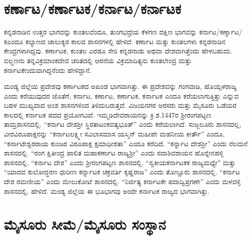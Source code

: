 \section{ಕರ್ಣಾಟ/ಕರ್ಣಾಟಕ/ಕರ್ನಾಟ/ಕರ್ನಾಟಕ}

ಕನ್ನಡನಾಡಿನ ಉತ್ತರ ಭಾಗವನ್ನು ಕುಂತಲವೆಂದೂ, ತುಂಗಭದ್ರೆಯ ಕೆಳಗಣ ದಕ್ಷಿಣ ಭಾಗವನ್ನು ಕರ್ನಾಟ/ಕರ್ಣ್ನಾಟ/ಕ\break ಎಂದೂ ಕಲ್ಯಾಣದ ಚಾಲುಕ್ಯರ ಕಾಲದ ಶಾಸನಗಳಲ್ಲಿ ಹೇಳಿದೆ. ಕರ್ಣಾಟ ಮತ್ತು ಕುಂತಲಗಳು ಕನ್ನಡನಾಡಿನ ಕೇಂದ್ರಗಳಾ\-ಗಿದ್ದವು. ಕರ್ಣಾಟಕ, ಕುಂತಲ ಎರಡೂ ಸೇರಿ ಕನ್ನಡನಾಡು ಅಥವಾ ದೇಶವಾಗಿತ್ತೆಂದು ಹೇಳಬಹುದು. ಬಿಲ್ಹಣನು ತನ್ನ\break ವಿಕ್ರಮಾಂಕದೇವ ಚರಿತದಲ್ಲಿ ಆರನೆಯ ವಿಕ್ರಮಾದಿತ್ಯನು ಕುಂತಲೇಂದ್ರ ಮತ್ತು ಕರ್ನಾಟಕೇಂದುವಾಗಿದ್ದನೆಂದು ಹೇಳಿದ್ದಾನೆ.

ಮಂಡ್ಯ ಜಿಲ್ಲೆಯ ಪ್ರದೇಶವು ಕರ್ಣಾಟಕದ ಅಖಂಡ ಭಾಗವಾಗಿತ್ತು. ಈ ಪ್ರದೇಶವನ್ನು ಗಂಗವಾಡಿ, ಹೊಯ್ಸಳರಾಜ್ಯ ಎಂದು ಕರೆಯುವುದರ ಜೊತೆಗೆ, ಕರ್ನಾಟ, ಕರ್ಣಾಟ, ಕರ್ಣಾಟಕ, ಕರ್ನಾಟಕ ಎಂದೂ ಕರೆಯಲಾಗುತ್ತಿತ್ತು ಎನ್ನುವ ಬಹಳ ಮುಖ್ಯವಾದ ಅಂಶ ಶಾಸನಗಳಿಂದ ತಿಳಿದುಬರುತ್ತದೆ. ವಿಜಯನಗರ ಅರಸರು ಮತ್ತು ಮೈಸೂರು ಒಡೆಯರ ಕಾಲದಲ್ಲಿ ಕರ್ನಾಟಕ ಪದದ ಪ್ರಯೋಗವಿದೆ. ಇಮ್ಮಡಿದೇವರಾಯನನ್ನು ಕ್ರಿ.ಶ.1447ರ ಶ‍್ರೀರಂಗಪಟ್ಟಣ ತಾಮ್ರಶಾಸನದಲ್ಲಿ. “ಕರ್ನಾಟ ದೇಶಶ‍್ರೀ ಸ್ಥಿರತಾಟಂಕವತ್ಯಭೂತ್​” ಎಂದು ಕರೆಯಲಾಗಿದೆ. ಸುಜ್ಜಲೂರು ಶಾಸನದಲ್ಲ, ವೀರವಿರೂಪಾಕ್ಷನನ್ನು “ಕರ್ನಾಟಲಕ್ಷ್ಮೀ ಸವಿಲಾಸಮಾಸ ಯಸ್ಮಿನ್​ ಮಹೀಪೇ ಮಹನೀಯ ಕೀರ್ತೌ” ಎಂದೂ, “ಕರ್ನಾಟೇಶ್ವರರಾಯ ಕುಂಜರ ವಿರೂಪಾಕ್ಷ ಕ್ಷಮಾಧೀಶತಾ” ಎಂದೂ ಕರೆದಿದೆ. “ಕರ್ನ್ನಾಟ ದೇಶಶ‍್ರೀ” ಎಂದು ನೆಲಮನೆ ಶಾಸನದಲ್ಲಿ. “ರಂಗ ಕ್ಷಿತೀಂದ್ರ ಪಾಲಿತ ಮಹಾಕರ್ಣಾಟ ರಾಜ್ಯಶ‍್ರೀ” ಎಂದು ಸದಾಶಿವರಾಯನ ಹೊನ್ನೇನಹಳ್ಳಿ ಶಾಸನದಲ್ಲಿ. “ಕರ್ನಾಟ ದೇಶ” ಎಂದು ಶ‍್ರೀರಂಗಪಟ್ಟಣ ಶಾಸನದಲ್ಲಿ. “ಸ್ವಕೀಯಕರ್ನಾಟಕಕ ರಾಜ್ಯಮಧ್ಯೇ” ಮತ್ತು “ಯಾದವ ಕುಲೋದ್ಧರಣ ಧುರೀಣ ಕರ್ನ್ನಾಟಕ ಚಕ್ರವರ್ತಿ ಕೃಷ್ಣರಾಜ” ಎಂದು ತೊಣ್ಣೂರು ಶಾಸನದಲ್ಲಿ. “ಕರ್ನಾಟ ದೇಶ ರಮಣೀಯ” ಎಂದು ಮೇಲುಕೋಟೆ ಶಾಸನದಲ್ಲಿ. “ನಿರ್ಜಿತ್ಯ ಕರ್ನಾಟಕೇ ಪದಾದ್ವಿಪ್ರಗಣೇ” ಎಂದು ಮಳವಳ್ಳಿ ಶಾಸನದಲ್ಲಿ. ಹೇಳಿದೆ. ಮಂಡ್ಯ ಜಿಲ್ಲೆಯ ಈ ಭೂಭಾಗವು ಅಂದೇ ಕರ್ನಾಟಕ ರಾಜ್ಯದ ಭಾಗವಾಗಿತ್ತು.

\section{ಮೈಸೂರು ಸೀಮೆ/ಮೈಸೂರು ಸಂಸ್ಥಾನ}

